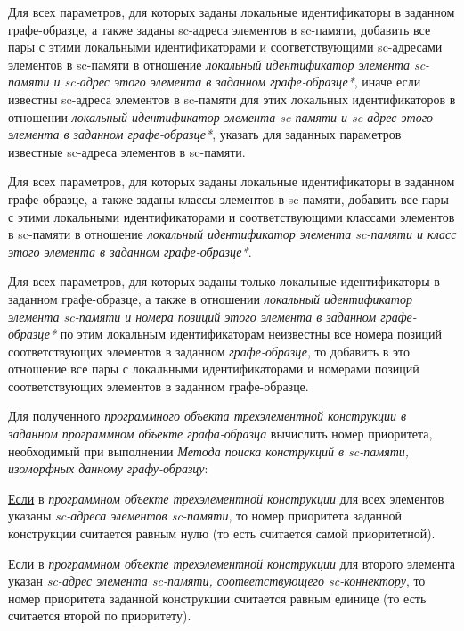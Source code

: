 \begin{SCn}
\begin{scnsubstruct}
\begin{scnsubstruct}
\begin{scnsubstruct}
\begin{scnsubstruct}
\begin{scnsubstruct}
\begin{scnsubstruct}
\begin{scnsubstruct}
\begin{scnsubstruct}
{\begin{scnitemize}
				\item Для всех параметров, для которых заданы локальные идентификаторы в заданном графе-образце, а также заданы sc-адреса элементов в sc-памяти, добавить все пары с этими локальными идентификаторами и соответствующими sc-адресами элементов в sc-памяти в отношение \textit{локальный идентификатор элемента sc-памяти и sc-адрес этого элемента в заданном графе-образце*}, иначе если известны sc-адреса элементов в sc-памяти для этих локальных идентификаторов в отношении \textit{локальный идентификатор элемента sc-памяти и sc-адрес этого элемента в заданном графе-образце*}, указать для заданных параметров известные sc-адреса элементов в sc-памяти.
				\item Для всех параметров, для которых заданы локальные идентификаторы в заданном графе-образце, а также заданы классы элементов в sc-памяти, добавить все пары с этими локальными идентификаторами и соответствующими классами элементов в sc-памяти в отношение \textit{локальный идентификатор элемента sc-памяти и класс этого элемента в заданном графе-образце*}.
				\item Для всех параметров, для которых заданы только локальные идентификаторы в заданном графе-образце, а также в отношении \textit{локальный идентификатор элемента sc-памяти и номера позиций этого элемента в заданном графе-образце*} по этим локальным идентификаторам неизвестны все номера позиций соответствующих элементов в заданном \textit{графе-образце}, то добавить в это отношение все пары с локальными идентификаторами и номерами позиций соответствующих элементов в заданном графе-образце.
				\item Для полученного \textit{программного объекта трехэлементной конструкции в заданном программном объекте графа-образца} вычислить номер приоритета, необходимый при выполнении \textit{Метода поиска конструкций в sc-памяти, изоморфных данному графу-образцу}:
				\begin{scnitemize}
					\item \uline{Если} в \textit{программном объекте трехэлементной конструкции} для всех элементов указаны \textit{sc-адреса элементов sc-памяти}, то номер приоритета заданной конструкции считается равным нулю (то есть считается самой приоритетной).
					\item \uline{Если} в \textit{программном объекте трехэлементной конструкции} для второго элемента указан \textit{sc-адрес элемента sc-памяти, соответствующего sc-коннектору}, то номер приоритета заданной конструкции считается равным единице (то есть считается второй по приоритету).

\end{scnitemize}
\end{scnitemize}}
\end{scnsubstruct}
\end{scnsubstruct}
\end{scnsubstruct}
\end{scnsubstruct}
\end{scnsubstruct}
\end{scnsubstruct}
\end{scnsubstruct}
\end{scnsubstruct}
\end{SCn}
